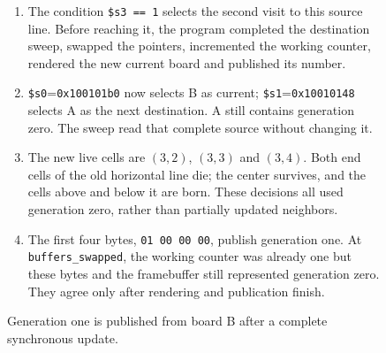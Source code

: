 \begin{figure}[htbp]
  \par\smallskip
  \begin{minipage}{\linewidth}
    \small
    \begin{enumerate}
      \item The condition \texttt{\$s3 == 1} selects the second visit to this source line. Before reaching it, the program completed the destination sweep, swapped the pointers, incremented the working counter, rendered the new current board and published its number.
      \item \texttt{\$s0}=\texttt{0x100101b0} now selects B as current; \texttt{\$s1}=\texttt{0x10010148} selects A as the next destination. A still contains generation zero. The sweep read that complete source without changing it.
      \item The new live cells are $(3,2)$, $(3,3)$ and $(3,4)$. Both end cells of the old horizontal line die; the center survives, and the cells above and below it are born. These decisions all used generation zero, rather than partially updated neighbors.
      \item The first four bytes, \texttt{01 00 00 00}, publish generation one. At \texttt{buffers\_swapped}, the working counter was already one but these bytes and the framebuffer still represented generation zero. They agree only after rendering and publication finish.
    \end{enumerate}
  \end{minipage}
  \caption{Generation one is published from board B after a complete synchronous update.}
  \label{capture:008-life-generations-f03-one}
\end{figure}
\par
